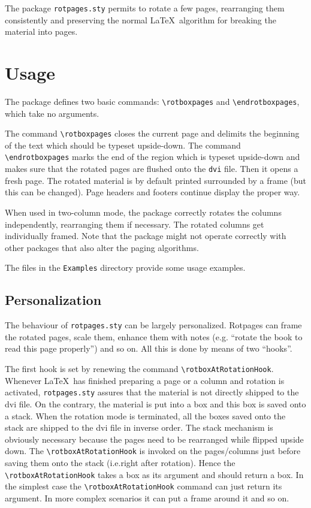\documentclass[12pt,twocolumn]{article}
\begin{document}
The package \texttt{rotpages.sty} permits to rotate a few pages,
rearranging them consistently and preserving the normal \LaTeX\
algorithm for breaking the material into pages. 


\section{Usage}
The package defines two basic commands: \verb|\rotboxpages| and
\verb|\endrotboxpages|, which take no arguments.

The command \verb|\rotboxpages| closes the current page and delimits
the beginning of the text which should be typeset upside-down. The
command \verb|\endrotboxpages| marks the end of the region which is
typeset upside-down and makes sure that the rotated pages are flushed
onto the \texttt{dvi} file. Then it opens a fresh page.  The rotated
material is by default printed surrounded by a frame (but this can be
changed).  Page headers and footers continue display the proper way.

When used in two-column mode, the package correctly rotates the
columns independently, rearranging them if necessary. The rotated
columns get individually framed. Note that the package might not
operate correctly with other packages that also alter the paging
algorithms.

The files in the \texttt{Examples} directory provide some usage
examples.

\subsection{Personalization}
The behaviour of \texttt{rotpages.sty} can be largely
personalized. Rotpages can frame the rotated pages, scale them,
enhance them with notes (e.g. ``rotate the book to read this page
properly'') and so on. All this is done by means of two ``hooks''.

The first hook is set by renewing the command
\verb|\rotboxAtRotationHook|. Whenever \LaTeX\ has finished preparing
a page or a column and rotation is activated, \texttt{rotpages.sty}
assures that the material is not directly shipped to the dvi file. On
the contrary, the material is put into a box and this box is saved
onto a stack. When the rotation mode is terminated, all the boxes
saved onto the stack are shipped to the dvi file in inverse order. The
stack mechanism is obviously necessary because the pages need to be
rearranged while flipped upside down. The \verb|\rotboxAtRotationHook|
is invoked on the pages/columns just before saving them onto the stack
(i.e.\@ right after rotation). Hence the \verb|\rotboxAtRotationHook|
takes a box as its argument and should return a box. In the simplest
case the \verb|\rotboxAtRotationHook| command can just return its
argument. In more complex scenarios it can put a frame around it and
so on.
\end{document}
